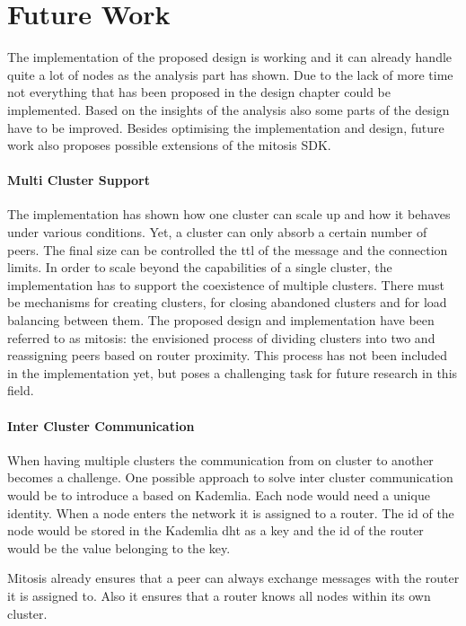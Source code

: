 \section{Future Work}\label{sec:future-work}
The implementation of the proposed design is working and it can already handle quite a lot of nodes as the analysis part has shown. Due to the lack of more time not everything that has been proposed in the design chapter could be implemented. Based on the insights of the analysis also some parts of the design have to be improved.
Besides optimising the implementation and design, future work also proposes possible extensions of the \gls{mitosis} SDK.

\paragraph{Multi Cluster Support}
The implementation has shown how one cluster can scale up and how it behaves under various conditions. Yet, a cluster can only absorb a certain number of peers. The final size can be controlled the \gls{ttl} of the \routerAlive message and the connection limits. In order to scale beyond the capabilities of a single cluster, the implementation has to support the coexistence of multiple clusters. There must be mechanisms for creating clusters, for closing abandoned clusters and for load balancing between them. The proposed design and implementation have been referred to as \gls{mitosis}: the envisioned process of dividing clusters into two and reassigning peers based on router proximity. This process has not been included in the implementation yet, but poses a challenging task for future research in this field.

\paragraph{Inter Cluster Communication}
When having multiple clusters the communication from on cluster to another becomes a challenge. One possible approach to solve inter cluster communication would be to introduce a  based on Kademlia. Each node would need a unique identity. When a node enters the network it is assigned to a router. The id of the node would be stored in the Kademlia \gls{dht} as a key and the id of the router would be the value belonging to the key. 

Mitosis already ensures that a peer can always exchange messages with the router it is assigned to. Also it ensures that a router knows all nodes within its own cluster. 

